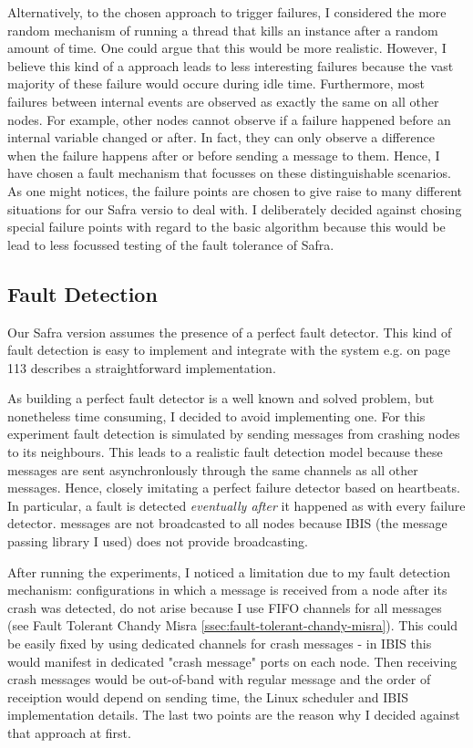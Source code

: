 	Alternatively, to the chosen approach to trigger failures, I considered the more random mechanism of running a thread that kills an instance after a random amount of time.
	One could argue that this would be more realistic.
	However, I believe this kind of a approach leads to less interesting failures because the vast majority of these failure would occure during idle time. 
	Furthermore, most failures between internal events are observed as exactly the same on all other nodes. 
	For example, other nodes cannot observe if a failure happened before an internal variable changed or after. 
	In fact, they can only observe a difference when the failure happens after or before sending a message to them.
	Hence, I have chosen a fault mechanism that focusses on these distinguishable scenarios.
	As one might notices, the failure points are chosen to give raise to many different situations for our Safra versio to deal with. 
	I deliberately decided against chosing special failure points with regard to the basic algorithm because this would be lead to less focussed testing of the fault tolerance of Safra.
	
\subsection{Fault Detection}
Our Safra version assumes the presence of a perfect fault detector.
This kind of fault detection is easy to implement and integrate with the system e.g.
\cite{fokkink:2018} on page 113 describes a straightforward implementation.

As building a perfect fault detector is a well known and solved problem, but nonetheless time consuming, I decided to avoid implementing one.
For this experiment fault detection is simulated by sending  messages from crashing nodes to its neighbours. 
This leads to a realistic fault detection model because these messages are sent asynchronlously through the same channels as all other messages. 
Hence, closely imitating a perfect failure detector based on heartbeats. 
In particular, a fault is detected \textit{eventually after} it happened as with every failure detector.
 messages are not broadcasted to all nodes because IBIS (the message passing library I used) does not provide broadcasting.

After running the experiments, I noticed a limitation due to my fault detection mechanism:
configurations in which a message is received from a node after its crash was detected, do not arise because I use FIFO channels for all messages (see Fault Tolerant Chandy Misra \cref{ssec:fault-tolerant-chandy-misra}).  
This could be easily fixed by using dedicated channels for crash messages - in IBIS this would manifest in dedicated "crash message" ports on each node.
Then receiving crash messages would be out-of-band with regular message and the order of receiption would depend on sending time, the Linux scheduler and IBIS implementation details.
The last two points are the reason why I decided against that approach at first.

